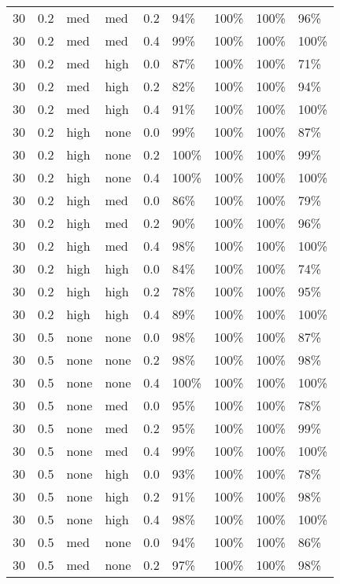 \begin{longtable}{rrllrllll}
  30 & 0.2 & med & med & 0.2 & 94\% & 100\% & 100\% & 96\% \\ 
  30 & 0.2 & med & med & 0.4 & 99\% & 100\% & 100\% & 100\% \\ 
  30 & 0.2 & med & high & 0.0 & 87\% & 100\% & 100\% & 71\% \\ 
  30 & 0.2 & med & high & 0.2 & 82\% & 100\% & 100\% & 94\% \\ 
  30 & 0.2 & med & high & 0.4 & 91\% & 100\% & 100\% & 100\% \\ 
  30 & 0.2 & high & none & 0.0 & 99\% & 100\% & 100\% & 87\% \\ 
  30 & 0.2 & high & none & 0.2 & 100\% & 100\% & 100\% & 99\% \\ 
  30 & 0.2 & high & none & 0.4 & 100\% & 100\% & 100\% & 100\% \\ 
  30 & 0.2 & high & med & 0.0 & 86\% & 100\% & 100\% & 79\% \\ 
  30 & 0.2 & high & med & 0.2 & 90\% & 100\% & 100\% & 96\% \\ 
  30 & 0.2 & high & med & 0.4 & 98\% & 100\% & 100\% & 100\% \\ 
  30 & 0.2 & high & high & 0.0 & 84\% & 100\% & 100\% & 74\% \\ 
  30 & 0.2 & high & high & 0.2 & 78\% & 100\% & 100\% & 95\% \\ 
  30 & 0.2 & high & high & 0.4 & 89\% & 100\% & 100\% & 100\% \\ 
  30 & 0.5 & none & none & 0.0 & 98\% & 100\% & 100\% & 87\% \\ 
  30 & 0.5 & none & none & 0.2 & 98\% & 100\% & 100\% & 98\% \\ 
  30 & 0.5 & none & none & 0.4 & 100\% & 100\% & 100\% & 100\% \\ 
  30 & 0.5 & none & med & 0.0 & 95\% & 100\% & 100\% & 78\% \\ 
  30 & 0.5 & none & med & 0.2 & 95\% & 100\% & 100\% & 99\% \\ 
  30 & 0.5 & none & med & 0.4 & 99\% & 100\% & 100\% & 100\% \\ 
  30 & 0.5 & none & high & 0.0 & 93\% & 100\% & 100\% & 78\% \\ 
  30 & 0.5 & none & high & 0.2 & 91\% & 100\% & 100\% & 98\% \\ 
  30 & 0.5 & none & high & 0.4 & 98\% & 100\% & 100\% & 100\% \\ 
  30 & 0.5 & med & none & 0.0 & 94\% & 100\% & 100\% & 86\% \\ 
  30 & 0.5 & med & none & 0.2 & 97\% & 100\% & 100\% & 98\% \\ 

\end{longtable}
